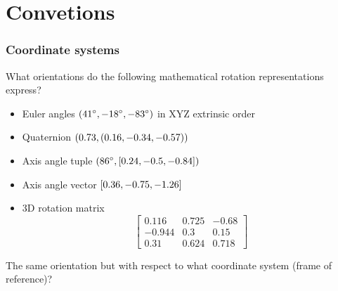 \documentclass{beamer}
\begin{document}
\frame{\titlepage}




\section{Convetions}

\begin{frame}
\frametitle{Coordinate systems}
What orientations do the following mathematical rotation representations express?
\begin{itemize}
    \item Euler angles $({41}^{\circ},{-18}^{\circ},{-83}^{\circ})$ in XYZ extrinsic order
    \item Quaternion $\textstyle(0.73,(0.16,-0.34,-0.57))$
    \item Axis angle tuple $({86}^{\circ},[0.24,-0.5,-0.84])$
    \item Axis angle vector $[0.36,-0.75,-1.26]$
    \item 3D rotation matrix 
    $$        
        \begin{bmatrix}
            0.116 & 0.725 & -0.68 \\
            -0.944 & 0.3 & 0.15 \\
            0.31 & 0.624 & 0.718
        \end{bmatrix}
    $$
\end{itemize} 
The same orientation but with respect to what coordinate system (frame of reference)?
\end{frame}
\end{document}
